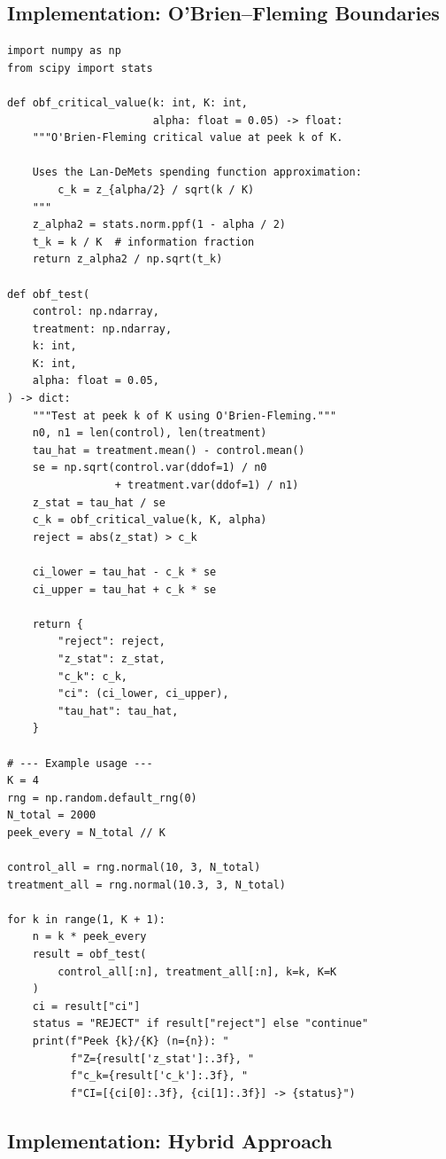 \documentclass[12pt, a4paper]{article}
\begin{document}
\subsection{Implementation: O'Brien--Fleming Boundaries}

\begin{lstlisting}
import numpy as np
from scipy import stats

def obf_critical_value(k: int, K: int,
                       alpha: float = 0.05) -> float:
    """O'Brien-Fleming critical value at peek k of K.

    Uses the Lan-DeMets spending function approximation:
        c_k = z_{alpha/2} / sqrt(k / K)
    """
    z_alpha2 = stats.norm.ppf(1 - alpha / 2)
    t_k = k / K  # information fraction
    return z_alpha2 / np.sqrt(t_k)

def obf_test(
    control: np.ndarray,
    treatment: np.ndarray,
    k: int,
    K: int,
    alpha: float = 0.05,
) -> dict:
    """Test at peek k of K using O'Brien-Fleming."""
    n0, n1 = len(control), len(treatment)
    tau_hat = treatment.mean() - control.mean()
    se = np.sqrt(control.var(ddof=1) / n0
                 + treatment.var(ddof=1) / n1)
    z_stat = tau_hat / se
    c_k = obf_critical_value(k, K, alpha)
    reject = abs(z_stat) > c_k

    ci_lower = tau_hat - c_k * se
    ci_upper = tau_hat + c_k * se

    return {
        "reject": reject,
        "z_stat": z_stat,
        "c_k": c_k,
        "ci": (ci_lower, ci_upper),
        "tau_hat": tau_hat,
    }

# --- Example usage ---
K = 4
rng = np.random.default_rng(0)
N_total = 2000
peek_every = N_total // K

control_all = rng.normal(10, 3, N_total)
treatment_all = rng.normal(10.3, 3, N_total)

for k in range(1, K + 1):
    n = k * peek_every
    result = obf_test(
        control_all[:n], treatment_all[:n], k=k, K=K
    )
    ci = result["ci"]
    status = "REJECT" if result["reject"] else "continue"
    print(f"Peek {k}/{K} (n={n}): "
          f"Z={result['z_stat']:.3f}, "
          f"c_k={result['c_k']:.3f}, "
          f"CI=[{ci[0]:.3f}, {ci[1]:.3f}] -> {status}")
\end{lstlisting}


\subsection{Implementation: Hybrid Approach}
\end{document}
